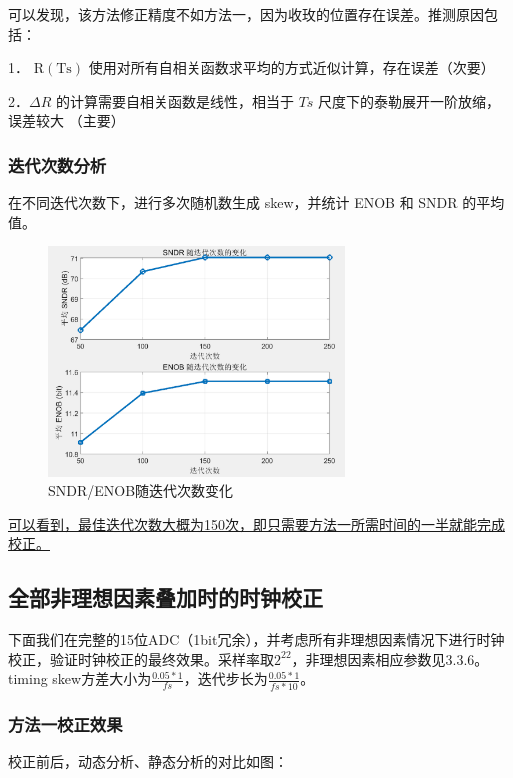 \documentclass[cs4size,a4paper]{ctexart}
\numberwithin{equation}{section}
\numberwithin{table}{section}
\numberwithin{figure}{section}
\begin{document}
		可以发现，该方法修正精度不如方法一，因为收玫的位置存在误差。推测原因包括：
		
		1． $\mathrm{R}(\mathrm{Ts})$ 使用对所有自相关函数求平均的方式近似计算，存在误差（次要）
		
		2．$\Delta R$ 的计算需要自相关函数是线性，相当于 $T s$ 尺度下的泰勒展开一阶放缩，误差较大 （主要）
			
		
		\subsubsection{迭代次数分析}
		在不同迭代次数下，进行多次随机数生成 skew，并统计 ENOB 和 SNDR 的平均值。
		
		\begin{figure}[H]
			\centering
			\includegraphics[width=0.7\textwidth]{figure/cor6.png}
			\caption{SNDR/ENOB随迭代次数变化} 
			\label{fig:cor6}
		\end{figure}
		
		\underline{可以看到，最佳迭代次数大概为150次，即只需要方法一所需时间的一半就能完成校正。}

		\subsection{全部非理想因素叠加时的时钟校正}
		下面我们在完整的15位ADC（1bit冗余），并考虑所有非理想因素情况下进行时钟校正，验证时钟校正的最终效果。采样率取$2^{22}$，非理想因素相应参数见3.3.6。timing skew方差大小为$\frac{0.05*1}{fs}$，迭代步长为$\frac{0.05*1}{fs*10}$。

		\subsubsection{方法一校正效果}

		校正前后，动态分析、静态分析的对比如图：
\end{document}
